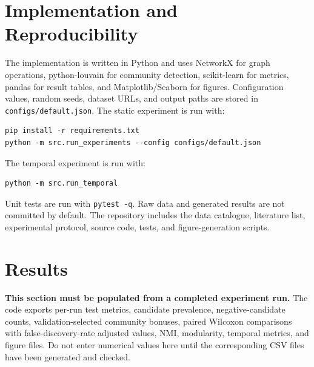\documentclass[11pt,a4paper]{article}
\begin{document}
\section{Implementation and Reproducibility}
The implementation is written in Python and uses NetworkX for graph operations, python-louvain for community detection, scikit-learn for metrics, pandas for result tables, and Matplotlib/Seaborn for figures. Configuration values, random seeds, dataset URLs, and output paths are stored in \texttt{configs/default.json}. The static experiment is run with:
\begin{verbatim}
pip install -r requirements.txt
python -m src.run_experiments --config configs/default.json
\end{verbatim}
The temporal experiment is run with:
\begin{verbatim}
python -m src.run_temporal
\end{verbatim}
Unit tests are run with \texttt{pytest -q}. Raw data and generated results are not committed by default. The repository includes the data catalogue, literature list, experimental protocol, source code, tests, and figure-generation scripts.

\section{Results}
\textbf{This section must be populated from a completed experiment run.} The code exports per-run test metrics, candidate prevalence, negative-candidate counts, validation-selected community bonuses, paired Wilcoxon comparisons with false-discovery-rate adjusted values, NMI, modularity, temporal metrics, and figure files. Do not enter numerical values here until the corresponding CSV files have been generated and checked.
\end{document}
